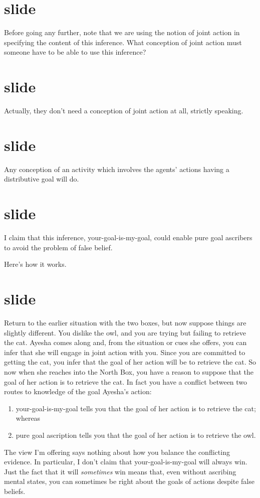 \documentclass[12pt,\papersize]{extarticle}
\begin{document}
\section{slide}
Before going any further,
note that we are using the notion of joint action in specifying the content of this inference.
What conception of joint action must someone have to be able to use this inference?


\section{slide}
Actually, they don't need a conception of joint action at all, strictly speaking.


\section{slide}
Any conception of an activity which involves the agents' actions having a distributive goal will do.


\section{slide}
I claim that this inference, your-goal-is-my-goal, could enable pure goal ascribers to avoid the problem of false belief.

Here's how it works.


\section{slide}
Return to the earlier situation with the two boxes, but now suppose things are slightly different.
You dislike the owl, and you are trying but failing to retrieve the cat.
Ayesha comes along and, from the situation or cues she offers, you can infer that she will engage in joint action with you.
Since you are committed to getting the cat,
you infer that the goal of her action will be to retrieve the cat.
So now when she reaches into the North Box, 
you have a reason to suppose that the goal of her action is to retrieve the cat.
In fact you have a conflict between two routes to knowledge of the  goal Ayesha's action:
\begin{enumerate}
\item your-goal-is-my-goal tells you that the goal of her action is to retrieve the cat; whereas
\item pure goal ascription tells you that  the goal of her action is to retrieve the owl.
\end{enumerate}
%
The view I'm offering says nothing about how you balance the conflicting evidence.
In particular, I don't claim that your-goal-is-my-goal will always win.
Just the fact that it will \emph{sometimes} win means that, even without ascribing mental states, you can sometimes be right about the goals of actions despite false beliefs.
\end{document}
